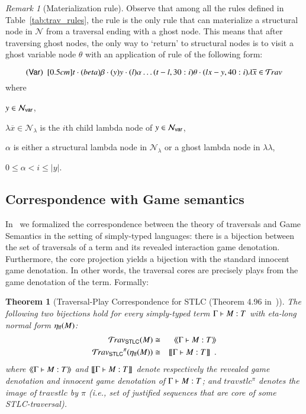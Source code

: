\documentclass{elsarticle}
\makeatletter
\theoremstyle{plain}
\newtheorem{theorem}{Theorem}[section]
\theoremstyle{definition}
\theoremstyle{remark}
\newtheorem{remark}{Remark}[section]
\newcommand\Nodes{\mathcal{N}}%
\newcommand\NodesVar{\Nodes_{\sf var}}%
\newcommand\NodesLmd{\Nodes_\lambda}%
\newcommand{\ghostlmd}{{\lambda\!\!\lambda}}
\newcommand{\ghostvar}{\theta}
\newcommand{\travulc}{\travset}
\newcommand{\travstlc}{{\travset_{\sf STLC}}}
\def\coresymbol{\pi} %
\renewcommand\ie{{\it i.e.\@\xspace}}
\makeatother
\begin{document}
\begin{remark}[Materialization rule]
Observe that among all the rules defined in Table~\ref{tab:trav_rules}, the rule  is the only rule that can materialize a structural node in $\Nodes$ from a traversal ending with a ghost node. This means that after traversing ghost nodes, the only way to `return' to structural nodes is to visit a ghost variable node $\ghostvar$ with an application of rule  of the following form:

$$\rulename{Var}\ \  \Pstr[0.5cm]{ t \cdot(beta){\beta} \cdot
(y){y} \cdot (l){\alpha}  \ldots (t-l,30:i){\ghostvar}
    \cdot (lx-y,40:i){\lambda \overline{x}}
     \in\travulc}$$
where
\begin{itemize*}[nosep,label=]
\item $y \in \NodesVar$,
\item $\lambda \overline{x} \in \NodesLmd$ is the $i$th child lambda node of $y \in \NodesVar$,
\item $\alpha$ is either a structural lambda node in $\Nodes_\lambda$ or a ghost lambda node in $\ghostlmd$,
\item $0\leq \alpha < i \leq |y|$.
\end{itemize*}
\end{remark}

\subsection{Correspondence with Game semantics}
\label{sec:traversal_correspondence_stlc}

In~\cite{BlumPhd} we formalized the correspondence between the theory of traversals and Game Semantics in the setting of simply-typed languages: there is a bijection between the set of traversals of a term and its revealed interaction game denotation. Furthermore, the core projection yields a bijection with the standard innocent game denotation.
In other words, the traversal cores are precisely plays from the game denotation of the term.
Formally:
\begin{theorem}[Traversal-Play Correspondence for STLC (Theorem 4.96 in~\cite{BlumPhd})]
\label{thm:gamesem_correspondence_stlc}
The following two bijections hold for every simply-typed term $\Gamma \vdash M :T$ with eta-long normal form $\eta_{\sf lf}(M)$:
\begin{eqnarray*}
    \travstlc(M) & \cong & \revsem{\Gamma \entail M :T} \\
    \travstlc^\coresymbol(\etalf{M}) & \cong & \sem{\Gamma \entail M :T} \enspace .
\end{eqnarray*}
where ${\langle\!\langle \Gamma \vdash M : T \rangle\!\rangle}$ and
${[\![ \Gamma \vdash M : T ]\!]}$
denote respectively the \emph{revealed game denotation} and \emph{innocent game denotation} of
$\Gamma \vdash M : T$;
and $travstlc^\coresymbol$ denotes the image of $travstlc$ by $\coresymbol$ (\ie, set of justified sequences that are \emph{core} of some STLC-traversal).
\end{theorem}
\end{document}
